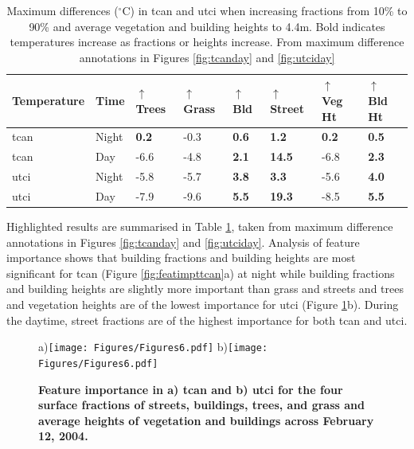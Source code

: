 \documentclass[final,3p,times,authoryear]{elsarticle}
\begin{document}
\begin{table}
\begin{tabular}{l l l l l l l l }
\hline
Temperature & Time & 
	$\uparrow$ Trees & 
	$\uparrow$ Grass & 
	$\uparrow$ Bld &
	$\uparrow$ Street &
	$\uparrow$ Veg Ht & 				
	$\uparrow$ Bld Ht 						
	\\
\hline
\gls{tcan} & Night &   
\textbf{0.2}&       %
-0.3& 				%
\textbf{0.6}&       %
\textbf{1.2} &       %
\textbf{0.2}&       %
\textbf{0.5}		%
\\
\gls{tcan} & Day &
-6.6&    	    %
-4.8&           %
\textbf{2.1}&   %
\textbf{14.5}&	%
-6.8&    	 	%
\textbf{2.3}   %
\\
\gls{utci} & Night &   
-5.8&         %
-5.7&         %
\textbf{3.8}& %
\textbf{3.3}&  %
-5.6&         %
\textbf{4.0}   %
\\
\gls{utci} & Day &	
-7.9&           %
-9.6&           %
\textbf{5.5}&   %
\textbf{19.3}&   %
-8.5&           %
\textbf{5.5}  %
\\
\end{tabular}
\caption{\label{tab:tempDiffs}Maximum differences ($^{\circ}$C) in \gls{tcan} and \gls{utci} when increasing fractions from 10\% to 90\% and average vegetation and building heights to 4.4m. Bold indicates temperatures increase as fractions or heights increase. From maximum difference annotations in Figures \ref{fig:tcanday} and \ref{fig:utciday}}
\end{table}

Highlighted results are summarised in Table \ref{tab:tempDiffs}, taken from maximum difference annotations in Figures \ref{fig:tcanday} and \ref{fig:utciday}. Analysis of feature importance shows that building fractions and building heights are most significant for \gls{tcan} (Figure \ref{fig:featimpttcan}a) at night while building fractions and building heights are slightly more important than grass and streets and trees and vegetation heights are of the lowest importance for \gls{utci} (Figure  \ref{fig:featimptutci}b). During the daytime, street fractions are of the highest importance for both \gls{tcan} and \gls{utci}.

\begin{figure}
\centering
{\tiny a)}\texttt{[image: Figures/Figures6.pdf]}
{\tiny b)}\texttt{[image: Figures/Figures6.pdf]}\\
\caption{\bf Feature importance in a) \gls{tcan} and b) \gls{utci} for the four surface fractions of streets, buildings, trees, and grass and average heights of vegetation and buildings across February 12, 2004.}
\label{fig:featimpttcan}
\label{fig:featimptutci}
\end{figure}
\end{document}
